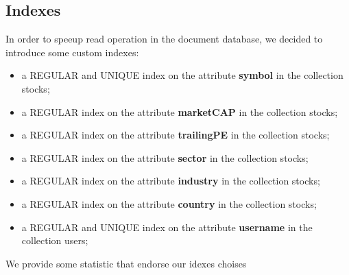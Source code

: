 \subsection{Indexes}
In order to speeup read operation in the document database, 
we decided to introduce some custom indexes:
\begin{itemize}
    \item a REGULAR and UNIQUE index on the attribute \textbf{symbol} in the collection stocks;
    \item a REGULAR index on the attribute \textbf{marketCAP} in the collection stocks;
    \item a REGULAR index on the attribute \textbf{trailingPE} in the collection stocks;
    \item a REGULAR index on the attribute \textbf{sector} in the collection stocks;
    \item a REGULAR index on the attribute \textbf{industry} in the collection stocks;
    \item a REGULAR index on the attribute \textbf{country} in the collection stocks;
    \item a REGULAR and UNIQUE index on the attribute \textbf{username} in the collection users;
\end{itemize}
We provide some statistic that endorse our idexes choises\\

